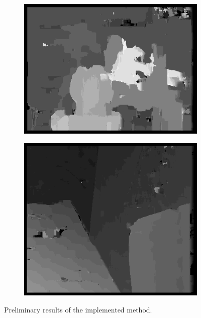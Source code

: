 \documentclass[letterpaper,12pt]{article}
\begin{document}
\begin{figure}[!h]
\begin{subfigure}[b]{0.2\textwidth}
        \end{subfigure}
        \quad
        \begin{subfigure}[b]{0.2\textwidth}
                \includegraphics[width=\textwidth]{tsukubaO.png}
        \end{subfigure}
        \quad
        \begin{subfigure}[b]{0.2\textwidth}
                \includegraphics[width=\textwidth]{venusO.png}
        \end{subfigure}
        \caption{Preliminary results of the implemented method.}\label{fig:stereoout}
\end{figure}
\end{document}
